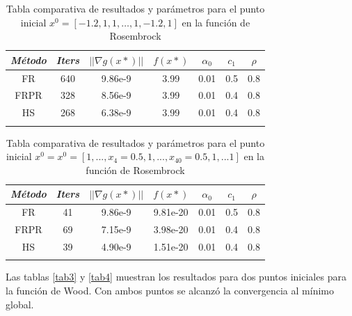 \documentclass[conference]{IEEEtran}
\begin{document}
\begin{table}[htbp]
    \caption{Tabla comparativa de resultados y parámetros para el punto inicial $x^0 = [-1.2, 1, 1, \dots , 1, -1.2, 1]$ en la función de Rosembrock}
    \begin{center}
        \begin{tabular}{|c|c|c|c|c|c|c|}
            \hline
			\textbf{\textit{Método}}& \textbf{\textit{Iters}}& \textbf{\textit{$||\nabla g(x*)||$}}& \textbf{\textit{$f(x*)$}}& \textbf{\textit{$\alpha_0$}}& \textbf{\textit{$c_1$}}& \textbf{\textit{$\rho$}} \\
            \hline
            FR   & 640 & 9.86e-9 & 3.99 & 0.01 & 0.5 & 0.8 \\
            FRPR & 328 & 8.56e-9 & 3.99 & 0.01 & 0.4 & 0.8 \\
            HS   & 268 & 6.38e-9 & 3.99 & 0.01 & 0.4 & 0.8 \\
            \hline
            \multicolumn{4}{l}{}
        \end{tabular}
        \label{tab1}
    \end{center}
\end{table}

\begin{table}[htbp]
    \caption{Tabla comparativa de resultados y parámetros para el punto inicial $x^0 = x^0 = [1,..., x_4=0.5,1,...,x_40=0.5, 1,...1]$ en la función de Rosembrock}
    \begin{center}
        \begin{tabular}{|c|c|c|c|c|c|c|}
            \hline
			\textbf{\textit{Método}}& \textbf{\textit{Iters}}& \textbf{\textit{$||\nabla g(x*)||$}}& \textbf{\textit{$f(x*)$}}& \textbf{\textit{$\alpha_0$}}& \textbf{\textit{$c_1$}}& \textbf{\textit{$\rho$}} \\
            \hline
            FR   & 41 & 9.86e-9 & 9.81e-20 & 0.01 & 0.5 & 0.8 \\
            FRPR & 69 & 7.15e-9 & 3.98e-20 & 0.01 & 0.4 & 0.8 \\
            HS   & 39 & 4.90e-9 & 1.51e-20 & 0.01 & 0.4 & 0.8 \\
            \hline
            \multicolumn{4}{l}{}
        \end{tabular}
        \label{tab2}
    \end{center}
\end{table}

Las tablas \ref{tab3} y \ref{tab4} muestran los resultados para dos puntos iniciales para la función
de Wood. Con ambos puntos se alcanzó la convergencia al mínimo global.
\end{document}
